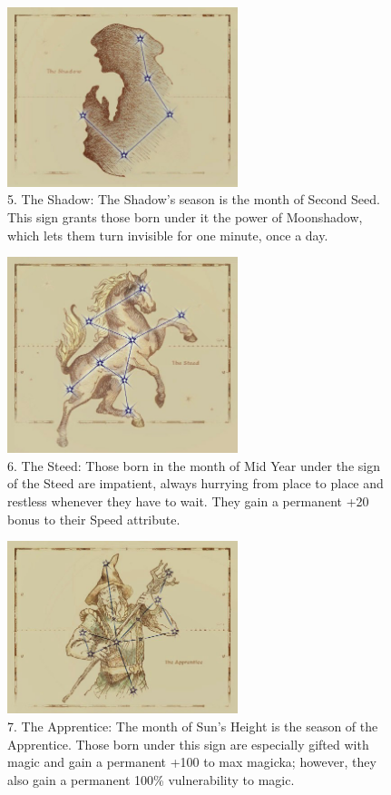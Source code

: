 \documentclass[12pt]{article}
\begin{document}
\begin{figure}[H]
\includegraphics[width=0.6\textwidth]{Shadow.png}
\centering
\caption*{5. The Shadow: The Shadow's season is the month of Second Seed. This sign grants those born under it the power of Moonshadow, which lets them turn invisible for one minute, once a day.}
\end{figure}

\begin{figure}[H]
\includegraphics[width=0.6\textwidth]{Steed.png}
\centering
\caption*{6. The Steed: Those born in the month of Mid Year under the sign of the Steed are impatient, always hurrying from place to place and restless whenever they have to wait. They gain a permanent +20 bonus to their Speed attribute.}
\end{figure}

\begin{figure}[H]
\includegraphics[width=0.6\textwidth]{Apprentice.png}
\centering
\caption*{7. The Apprentice: The month of Sun's Height is the season of the Apprentice. Those born under this sign are especially gifted with magic and gain a permanent +100 to max magicka; however, they also gain a permanent 100\% vulnerability to magic.}
\end{figure}
\end{document}

